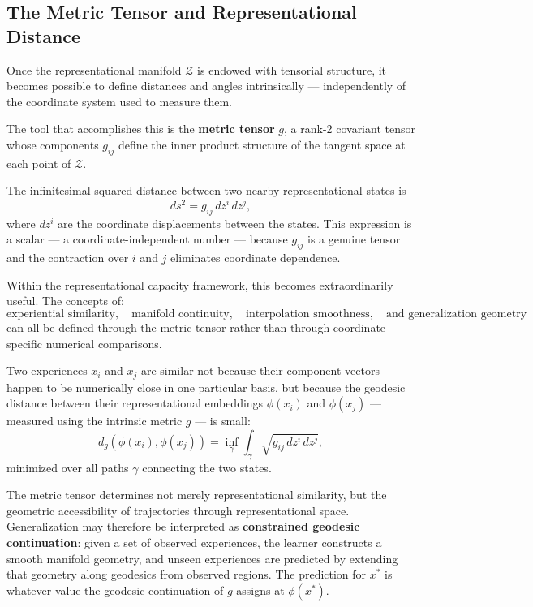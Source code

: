 \documentclass[12pt,a4paper]{article}
\begin{document}
\subsection{The Metric Tensor and Representational Distance}

Once the representational manifold $\mathcal{Z}$ is endowed with tensorial structure, it becomes possible to define distances and angles intrinsically --- independently of the coordinate system used to measure them.

The tool that accomplishes this is the \textbf{metric tensor} $g$, a rank-2 covariant tensor whose components $g_{ij}$ define the inner product structure of the tangent space at each point of $\mathcal{Z}$.

The infinitesimal squared distance between two nearby representational states is
\[
ds^2 = g_{ij} \, dz^i \, dz^j,
\]
where $dz^i$ are the coordinate displacements between the states. This expression is a scalar --- a coordinate-independent number --- because $g_{ij}$ is a genuine tensor and the contraction over $i$ and $j$ eliminates coordinate dependence.

Within the representational capacity framework, this becomes extraordinarily useful. The concepts of:
\[
\text{experiential similarity},
\quad
\text{manifold continuity},
\quad
\text{interpolation smoothness},
\quad
\text{and generalization geometry}
\]
can all be defined through the metric tensor rather than through coordinate-specific numerical comparisons.

Two experiences $x_i$ and $x_j$ are similar not because their component vectors happen to be numerically close in one particular basis, but because the geodesic distance between their representational embeddings $\phi(x_i)$ and $\phi(x_j)$ --- measured using the intrinsic metric $g$ --- is small:
\[
d_g(\phi(x_i), \phi(x_j)) = \inf_\gamma \int_\gamma \sqrt{g_{ij} \, dz^i \, dz^j},
\]
minimized over all paths $\gamma$ connecting the two states.

The metric tensor determines not merely representational similarity, but the geometric accessibility of trajectories through representational space. Generalization may therefore be interpreted as \textbf{constrained geodesic continuation}: given a set of observed experiences, the learner constructs a smooth manifold geometry, and unseen experiences are predicted by extending that geometry along geodesics from observed regions. The prediction for $x^*$ is whatever value the geodesic continuation of $g$ assigns at $\phi(x^*)$.
\end{document}
